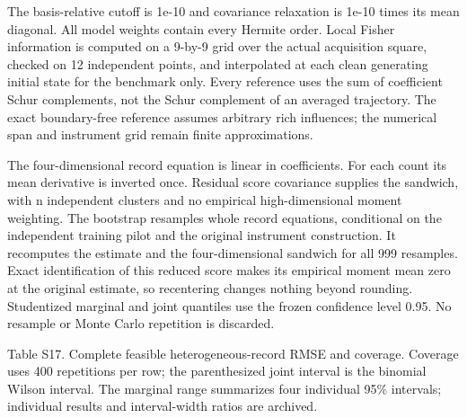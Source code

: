 \documentclass[
  american,
  11pt,
]{article}
\begin{document}
The basis-relative cutoff is 1e-10 and covariance relaxation is 1e-10
times its mean diagonal. All model weights contain every Hermite order.
Local Fisher information is computed on a 9-by-9 grid over the actual
acquisition square, checked on 12 independent points, and interpolated
at each clean generating initial state for the benchmark only. Every
reference uses the sum of coefficient Schur complements, not the Schur
complement of an averaged trajectory. The exact boundary-free reference
assumes arbitrary rich influences; the numerical span and instrument
grid remain finite approximations.

The four-dimensional record equation is linear in coefficients. For each
count its mean derivative is inverted once. Residual score covariance
supplies the sandwich, with n independent clusters and no empirical
high-dimensional moment weighting. The bootstrap resamples whole record
equations, conditional on the independent training pilot and the
original instrument construction. It recomputes the estimate and the
four-dimensional sandwich for all 999 resamples. Exact identification of
this reduced score makes its empirical moment mean zero at the original
estimate, so recentering changes nothing beyond rounding. Studentized
marginal and joint quantiles use the frozen confidence level 0.95. No
resample or Monte Carlo repetition is discarded.

Table S17. Complete feasible heterogeneous-record RMSE and coverage.
Coverage uses 400 repetitions per row; the parenthesized joint interval
is the binomial Wilson interval. The marginal range summarizes four
individual 95\% intervals; individual results and interval-width ratios
are archived.
\end{document}
